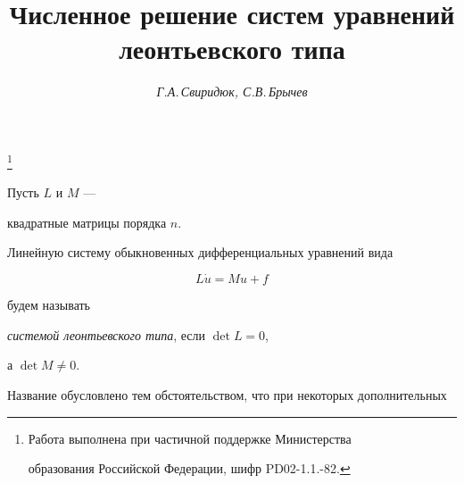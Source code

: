 








\author{\it Г.А.\,Свиридюк, С.В.\,Брычев}




\title{Численное решение систем уравнений\\


леонтьевского типа}


\thanks{Работа выполнена при частичной поддержке Министерства


образования Российской Федерации, шифр PD02-1.1.-82.}





\date{}




\pagestyle{plain} %







\maketitle


\label{begin}











Пусть $L$ и $M$ ---


квадратные матрицы порядка $n$.


Линейную систему обыкновенных дифференциальных уравнений вида


\begin{equation}


L\dot u = Mu + f \tag{0.1}


\end{equation}


будем называть


{\it системой леонтьевского типа}, если $\det L = 0$,


а $\det M \neq 0$.


Название обусловлено тем обстоятельством, что при некоторых дополнительных


